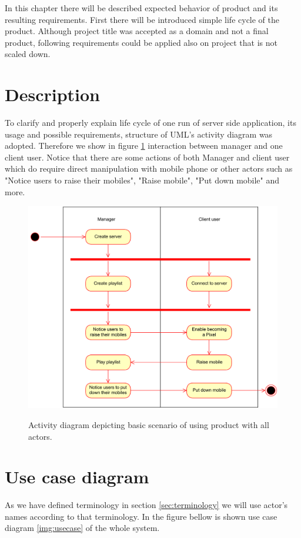 In this chapter there will be described expected behavior of product and its resulting requirements. 
First there will be introduced simple life cycle of the product.
Although project title was accepted as a domain and not a final product, following requirements could be applied also on project that is not scaled down.

\section{Description}
To clarify and properly explain life cycle of one run of server side application, its usage and possible requirements, structure of UML's activity diagram was adopted. 
Therefore we show in figure \ref{img:activity_diagram} interaction between manager and one client user.
Notice that there are some actions of both Manager and client user which do require direct manipulation with mobile phone or other actors such as "Notice users to raise their mobiles", "Raise mobile", "Put down mobile" and more.

\begin{figure}[h!]
    
    \begin{center}
    \includegraphics[scale=0.4]{images/activity_diagram.pdf}
    \label{img:activity_diagram}
    \caption{Activity diagram depicting basic scenario of using product with all actors.}
    \end{center}
\end{figure}


\section{Use case diagram}
As we have defined terminology in section \ref{sec:terminology} we will use actor's names according to that terminology.
In the figure bellow is shown use case diagram \ref{img:usecase} of the whole system.

